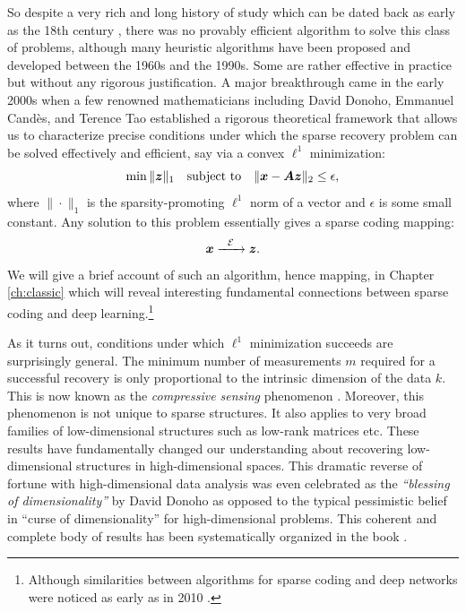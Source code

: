\documentclass[../../book-main.tex]{subfiles}
\begin{document}
So despite a very rich and long history of study which can be dated back as early as  the 18th century \cite{Boscovichca1750}, there was no provably efficient algorithm to solve this class of problems, although many heuristic algorithms have been proposed and developed between the 1960s and the 1990s. Some are rather effective in practice but without any rigorous justification. A major breakthrough came in the early 2000s when a few renowned mathematicians including David Donoho, Emmanuel Cand\`{e}s, and Terence Tao \cite{donoho2005neighborly,Candes2005,CandesE2005-IT} established a rigorous theoretical framework that allows us to characterize  precise conditions under which the sparse recovery problem can be solved effectively and efficient, say via a convex $\ell^1$ minimization:
\begin{equation}
    \min \|\bm{z}\|_1 \quad \mbox{subject to} \quad \| \bm{x} - \boldsymbol{A}\bm{z}\|_2 \le \epsilon,
\end{equation}
where $\|\cdot \|_1$ is the sparsity-promoting $\ell^1$ norm of a vector and $\epsilon$ is some small constant. Any solution to this problem essentially gives a sparse coding mapping:
\begin{equation}
    \bm{x}   \xrightarrow{\hspace{2mm} \mathcal{E} \hspace{2mm}}  \bm{z}.
       \label{eqn:decoding-sparse}
\end{equation}
We will give a brief account of such an algorithm, hence mapping, in Chapter \ref{ch:classic} which will reveal interesting fundamental connections between sparse coding and deep learning.\footnote{Although similarities between algorithms for sparse coding and deep networks were noticed as early as in 2010 \cite{gregor2010learning}.}

As it turns out, conditions under which $\ell^1$ minimization succeeds are surprisingly general. The minimum number of measurements $m$ required for a successful recovery is only proportional to the intrinsic dimension of the data $k$. This is now known as the {\em compressive sensing} phenomenon \cite{CandesE2006-ICM}. Moreover, this phenomenon is not unique to sparse structures. It also applies to very broad families of low-dimensional structures such as low-rank matrices etc. These results have fundamentally changed our understanding about recovering low-dimensional structures in high-dimensional spaces. This dramatic reverse of fortune with high-dimensional data analysis was even celebrated as the {\em ``blessing of dimensionality''} by David Donoho \cite{DonohoD2000} as opposed to the typical pessimistic belief in  ``curse of dimensionality'' for high-dimensional problems. This coherent and complete body of results has  been systematically organized in the book \cite{Wright-Ma-2022}. 
\end{document}
